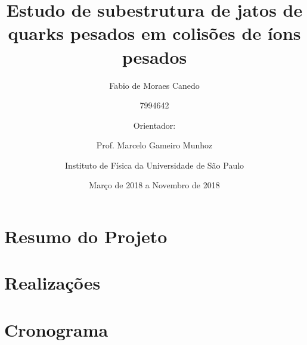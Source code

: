 \documentclass[a4paper,12pt]{article}
\title{Estudo de subestrutura de jatos de quarks pesados em colisões de íons pesados}
\author{Fabio de Moraes Canedo \and
7994642 \and
Orientador: \and
Prof. Marcelo Gameiro Munhoz \and
Instituto de Física da Universidade de São Paulo \and
Março de 2018 a Novembro de 2018}
\begin{document}
\maketitle

\blankpage

%

%

\section{Resumo do Projeto}



\section{Realizações}



\section{Cronograma}





%
\end{document}
